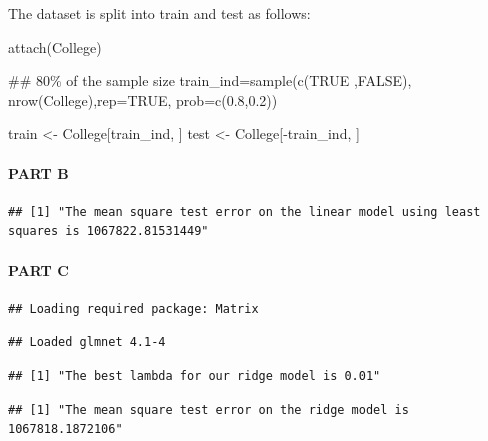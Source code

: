 \documentclass[
]{article}
\newenvironment{Shaded}{}{}
\newcommand{\AttributeTok}[1]{#1}
\newcommand{\ConstantTok}[1]{#1}
\newcommand{\DocumentationTok}[1]{\textcolor[rgb]{0.00,0.50,0.00}{#1}}
\newcommand{\FloatTok}[1]{#1}
\newcommand{\FunctionTok}[1]{#1}
\newcommand{\NormalTok}[1]{#1}
\newcommand{\OtherTok}[1]{\textcolor[rgb]{1.00,0.25,0.00}{#1}}
\newcommand{\SpecialCharTok}[1]{\textcolor[rgb]{0.00,0.50,0.50}{#1}}
\begin{document}
The dataset is split into train and test as follows:

\begin{Shaded}
\begin{Highlighting}[]
\FunctionTok{attach}\NormalTok{(College)}

\DocumentationTok{\#\# 80\% of the sample size}
\NormalTok{train\_ind}\OtherTok{=}\FunctionTok{sample}\NormalTok{(}\FunctionTok{c}\NormalTok{(}\ConstantTok{TRUE}\NormalTok{ ,}\ConstantTok{FALSE}\NormalTok{), }\FunctionTok{nrow}\NormalTok{(College),}\AttributeTok{rep=}\ConstantTok{TRUE}\NormalTok{, }\AttributeTok{prob=}\FunctionTok{c}\NormalTok{(}\FloatTok{0.8}\NormalTok{,}\FloatTok{0.2}\NormalTok{))}

\NormalTok{train }\OtherTok{\textless{}{-}}\NormalTok{ College[train\_ind, ]}
\NormalTok{test }\OtherTok{\textless{}{-}}\NormalTok{ College[}\SpecialCharTok{{-}}\NormalTok{train\_ind, ]}
\end{Highlighting}
\end{Shaded}

\hypertarget{part-b-2}{%
\paragraph{PART B}\label{part-b-2}}

\begin{verbatim}
## [1] "The mean square test error on the linear model using least squares is 1067822.81531449"
\end{verbatim}

\hypertarget{part-c-2}{%
\paragraph{PART C}\label{part-c-2}}

\begin{verbatim}
## Loading required package: Matrix
\end{verbatim}

\begin{verbatim}
## Loaded glmnet 4.1-4
\end{verbatim}

\begin{verbatim}
## [1] "The best lambda for our ridge model is 0.01"
\end{verbatim}

\begin{verbatim}
## [1] "The mean square test error on the ridge model is 1067818.1872106"
\end{verbatim}
\end{document}
